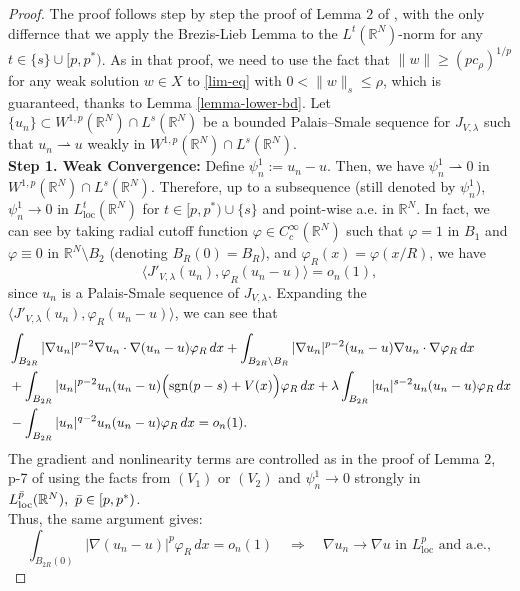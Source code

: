 \documentclass[11pt,reqno]{amsart}
\theoremstyle{definition}
\numberwithin{equation}{section}
\numberwithin{theorem}{section}
\numberwithin{equation}{section}
\numberwithin{theorem}{section}
\newcommand{\rn}{\mathbb{R}^N}
\newcommand{\R}{\mathbb{R}}
\begin{document}
\begin{proof}
The proof follows step by step the proof of Lemma $2$ of \cite{dhara2025normalised}, with the only differnce that we apply the Brezis-Lieb Lemma to the $L^t(\R^N)$-norm for any $t\in\{s\}\cup[p,p^*)$. As in that proof, we need to use the fact that $\|w\|\ge(p c_\rho)^{1/p}$ for any weak solution $w\in X$ to \eqref{lim-eq} with $0<\|w\|_s\le \rho$, which is guaranteed, thanks to Lemma \ref{lemma-lower-bd}.
\newline
Let $\{u_n\} \subset W^{1,p}(\mathbb{R}^N) \cap L^s(\mathbb{R}^N)$ be a bounded Palais--Smale sequence for $J_{V,\lambda}$ such that $u_n \rightharpoonup u$ weakly in $W^{1,p}(\mathbb{R}^N) \cap L^s(\mathbb{R}^N)$.\\
{\bf Step 1. Weak Convergence:}
Define $\psi_n^1 := u_n - u$. Then, we have $\psi_n^1 \rightharpoonup 0$ in $W^{1,p}(\mathbb{R}^N) \cap L^s(\mathbb{R}^N)$. Therefore, up to a subsequence (still denoted by $\psi^1_n$), $\psi_n^1 \to 0$ in $L^t_{\mathrm{loc}}(\mathbb{R}^N)$ for $t \in [p, p^*)\cup\{s\}$ and point-wise a.e. in $\R^N$.
In fact, we can see by taking radial cutoff function $\varphi \in C^\infty_c(\mathbb{R}^N)$ such that $\varphi=1$ in $B_1$ and $\varphi\equiv 0$ in $\rn\setminus B_2$ (denoting $B_R(0)=B_R$), and $\varphi_R(x) = \varphi(x/R)$, we have
\[
\langle J'_{V,\lambda}(u_n),\varphi_R (u_n - u)\rangle = o_n(1),
\]
since $u_n$ is a Palais-Smale sequence of $J_{V,\lambda}$. 
Expanding the $\langle J'_{V,\lambda}(u_n),\varphi_R (u_n - u)\rangle$, we can see that
\begin{align*}
&\int_{B_{2R}} |\nabla u_n|^{p-2} \nabla u_n \cdot \nabla(u_n - u) \varphi_R \,dx+ \int_{B_{2R} \setminus B_R} |\nabla u_n|^{p-2} (u_n - u) \nabla u_n \cdot \nabla \varphi_R \,dx\\
&+ \int_{B_{2R}} |u_n|^{p-2} u_n (u_n - u) \Bigl({\rm sgn}(p-s) + V(x)\Bigr)\varphi_R\,dx+\lambda\int_{B_{2R}} |u_n|^{s-2} u_n (u_n - u) \varphi_R\,dx \\
&- \int_{B_{2R}} |u_n|^{q-2} u_n (u_n - u) \varphi_R\,dx = o_n(1).
\end{align*}
The gradient and nonlinearity terms are controlled as in the proof of Lemma $2$, p-7 of \cite{dhara2025normalised} using the facts from $(V_1)$ or $(V_2)$ and $\psi_n^1\to 0$ strongly in $L^{\bar{p}}_{\rm loc}(\rn),\ \bar{p}\in[p,p^*)$.\\
Thus, the same argument gives:
\[
\int_{B_{2R}(0)} |\nabla(u_n - u)|^p \varphi_R \, dx = o_n(1) \quad \Rightarrow \quad \nabla u_n \to \nabla u \text{ in } L^p_{\mathrm{loc}} \text{ and a.e.},
\]
\end{proof}
\end{document}
